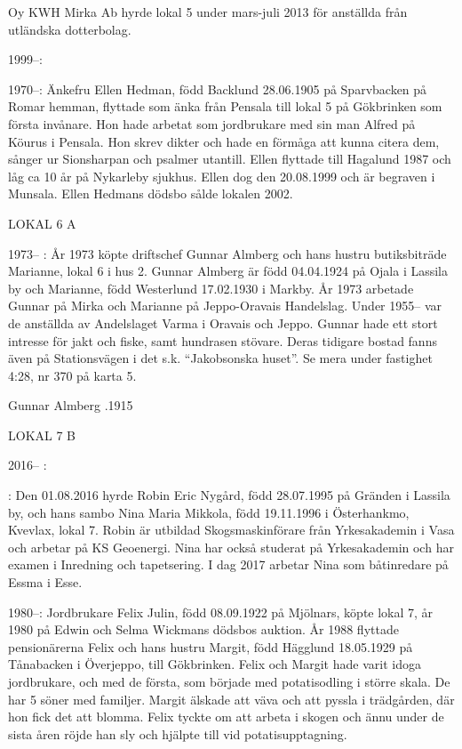 Oy KWH Mirka Ab hyrde lokal 5 under mars-juli 2013 för anställda från utländska dotterbolag.

 1999--:

 1970--:
Änkefru Ellen Hedman, född Backlund 28.06.1905 på Sparvbacken på Romar hemman, flyttade som änka från Pensala till lokal 5 på Gökbrinken som första invånare. Hon hade arbetat som jordbrukare med sin man Alfred på Köurus i Pensala. Hon skrev dikter och hade en förmåga att kunna citera dem, sånger ur Sionsharpan och psalmer utantill. Ellen flyttade till Hagalund 1987 och låg ca 10 år på Nykarleby sjukhus. Ellen dog den 20.08.1999 och är begraven i Munsala. Ellen Hedmans dödsbo sålde lokalen 2002.


LOKAL 6 A

 1973-- :
År 1973 köpte driftschef Gunnar Almberg och hans hustru butiksbiträde Marianne, lokal 6 i hus 2. Gunnar Almberg är född 04.04.1924 på Ojala i Lassila by och Marianne, född Westerlund 17.02.1930 i Markby.  År 1973 arbetade Gunnar på Mirka och Marianne på Jeppo-Oravais Handelslag. Under 1955-- var de anställda av Andelslaget Varma i Oravais och Jeppo. Gunnar hade ett stort intresse för jakt och fiske, samt hundrasen stövare.
Deras tidigare bostad fanns även på Stationsvägen i det s.k. ``Jakobsonska huset''.  Se mera under fastighet 4:28, nr 370 på karta 5.

Gunnar Almberg .1915


LOKAL 7 B

 2016-- :

:
Den 01.08.2016 hyrde Robin Eric Nygård, född 28.07.1995 på Gränden i Lassila by, och hans sambo	Nina Maria Mikkola, född 19.11.1996 i Österhankmo, Kvevlax, lokal 7. Robin är utbildad Skogsmaskinförare från Yrkesakademin i Vasa och arbetar på KS Geoenergi.	Nina har också studerat på Yrkesakademin och har examen i Inredning och tapetsering. I dag 2017 arbetar Nina som båtinredare på Essma i Esse.

 1980--:
Jordbrukare Felix Julin, född 08.09.1922 på Mjölnars, köpte lokal 7, år 1980 på Edwin och Selma Wickmans dödsbos auktion. År 1988 flyttade pensionärerna Felix och hans hustru Margit, född Hägglund 18.05.1929 på Tånabacken i Överjeppo, till Gökbrinken. Felix och Margit hade varit idoga jordbrukare, och med de första, som började med potatisodling i större skala. De har 5 söner med familjer. Margit älskade att väva och att pyssla i trädgården, där hon fick det att blomma. Felix tyckte om att arbeta i skogen och ännu under de sista åren röjde han sly och hjälpte till vid potatisupptagning.

